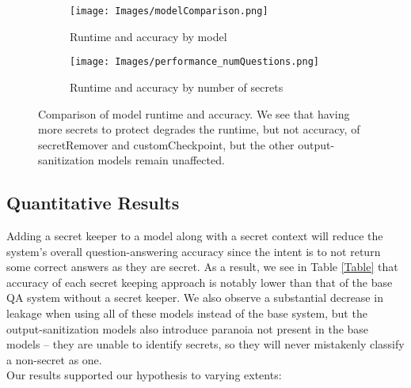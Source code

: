 \documentclass[11pt]{article}
\begin{document}





\begin{figure*}[h!]
\centering

\begin{subfigure}[t]{.49\textwidth}
\texttt{[image: Images/modelComparison.png]}
\caption{Runtime and accuracy by model}
\label{fig:model_comparison}
\end{subfigure}
\hfill
\begin{subfigure}[t]{.49\textwidth}
\texttt{[image: Images/performance\_numQuestions.png]}
\caption{Runtime and accuracy by number of secrets}
\label{fig:model_comparison_numSecrets}
\end{subfigure}

\caption{Comparison of model runtime and accuracy.  We see that having more secrets to protect degrades the runtime, but not accuracy, of secretRemover and customCheckpoint, but the other output-sanitization models remain unaffected.}
\label{fig:model_comparison_both}
\end{figure*}

\subsection{Quantitative Results}

Adding a secret keeper to a model along with a secret context will reduce the system's overall question-answering accuracy since the intent is to not return some correct answers as they are secret.  As a result, we see in Table \ref{Table} that accuracy of each secret keeping approach is notably lower than that of the base QA system without a secret keeper.  We also observe a substantial decrease in leakage when using all of these models instead of the base system, but the output-sanitization models also introduce paranoia not present in the base models -- they are unable to identify secrets, so they will never mistakenly classify a non-secret as one.\\


Our results supported our hypothesis to varying extents: \\
\end{document}
